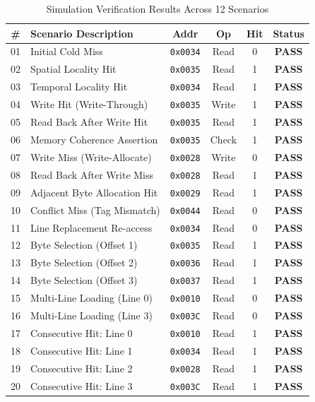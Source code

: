 \documentclass[conference]{IEEEtran}
\begin{document}
\begin{table}[htbp]
\caption{Simulation Verification Results Across 12 Scenarios}
\label{tab:results}
\centering
\begin{tabularx}{\columnwidth}{c X c c c c}
\toprule
\textbf{\#} & \textbf{Scenario Description} & \textbf{Addr} & \textbf{Op} & \textbf{Hit} & \textbf{Status} \\
\midrule
01 & Initial Cold Miss & \texttt{0x0034} & Read  & 0 & \textbf{PASS} \\
02 & Spatial Locality Hit & \texttt{0x0035} & Read  & 1 & \textbf{PASS} \\
03 & Temporal Locality Hit & \texttt{0x0034} & Read  & 1 & \textbf{PASS} \\
04 & Write Hit (Write-Through) & \texttt{0x0035} & Write & 1 & \textbf{PASS} \\
05 & Read Back After Write Hit & \texttt{0x0035} & Read  & 1 & \textbf{PASS} \\
06 & Memory Coherence Assertion & \texttt{0x0035} & Check & 1 & \textbf{PASS} \\
07 & Write Miss (Write-Allocate) & \texttt{0x0028} & Write & 0 & \textbf{PASS} \\
08 & Read Back After Write Miss & \texttt{0x0028} & Read  & 1 & \textbf{PASS} \\
09 & Adjacent Byte Allocation Hit & \texttt{0x0029} & Read  & 1 & \textbf{PASS} \\
10 & Conflict Miss (Tag Mismatch) & \texttt{0x0044} & Read  & 0 & \textbf{PASS} \\
11 & Line Replacement Re-access & \texttt{0x0034} & Read  & 0 & \textbf{PASS} \\
12 & Byte Selection (Offset 1) & \texttt{0x0035} & Read  & 1 & \textbf{PASS} \\
13 & Byte Selection (Offset 2) & \texttt{0x0036} & Read  & 1 & \textbf{PASS} \\
14 & Byte Selection (Offset 3) & \texttt{0x0037} & Read  & 1 & \textbf{PASS} \\
15 & Multi-Line Loading (Line 0) & \texttt{0x0010} & Read  & 0 & \textbf{PASS} \\
16 & Multi-Line Loading (Line 3) & \texttt{0x003C} & Read  & 0 & \textbf{PASS} \\
17 & Consecutive Hit: Line 0 & \texttt{0x0010} & Read  & 1 & \textbf{PASS} \\
18 & Consecutive Hit: Line 1 & \texttt{0x0034} & Read  & 1 & \textbf{PASS} \\
19 & Consecutive Hit: Line 2 & \texttt{0x0028} & Read  & 1 & \textbf{PASS} \\
20 & Consecutive Hit: Line 3 & \texttt{0x003C} & Read  & 1 & \textbf{PASS} \\
\bottomrule
\end{tabularx}
\end{table}
\end{document}
